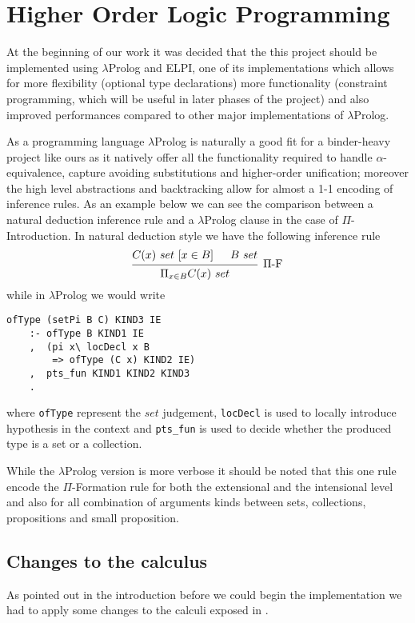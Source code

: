 
\section{Higher Order Logic Programming}

At the beginning of our work it was decided that the this project should be implemented using $\lambda$Prolog and ELPI, one of its implementations which allows for more flexibility (\eg optional type declarations) more functionality (\eg constraint programming, which will be useful in later phases of the project) and also improved performances compared to other major implementations of $\lambda$Prolog.

As a programming language $\lambda$Prolog is naturally a good fit for a binder-heavy project like ours as it natively offer all the functionality required to handle $\alpha$-equiv\-a\-lence, capture avoiding substitutions and higher-order unification; moreover the high level abstractions and backtracking allow for almost a 1-1 encoding of inference rules. As an example  below we can see the comparison between a natural deduction inference rule and a $\lambda$Prolog clause in the case of $\Pi$-Introduction.
In natural deduction style we have the following inference rule
\[
\begin{prooftree}
\hypo{C(x)\ set\ [x \in B]}
\hypo{B\ set}
\infer{2}[\ensuremath{\Pi}-F]{\Pi_{x\in B}{C(x)}\ set}
\end{prooftree}\]
while in $\lambda$Prolog we would write
\begin{verbatim}
ofType (setPi B C) KIND3 IE
    :- ofType B KIND1 IE
    ,  (pi x\ locDecl x B
        => ofType (C x) KIND2 IE)
    ,  pts_fun KIND1 KIND2 KIND3
    .
\end{verbatim}
where \verb|ofType| represent the $set$ judgement, \verb|locDecl| is used to locally introduce hypothesis in the context and \verb|pts_fun| is used to decide whether the produced type is a set or a collection. 

While the $\lambda$Prolog version is more verbose it should be noted that this one rule encode the $\Pi$-Formation rule for both the extensional and the intensional level and also for all combination of arguments kinds between sets, collections, propositions and small proposition.

\subsection{Changes to the calculus}
As pointed out in the introduction before we could begin the implementation we had to apply some changes to the calculi exposed in \cite{maietti2009minimalist}.

